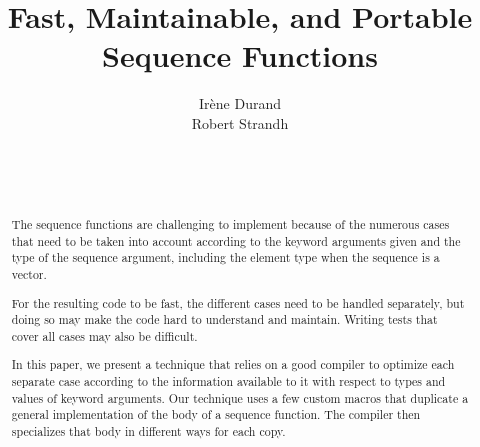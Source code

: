 \documentclass{acm_proc_article-sp}
\begin{document}
\title{Fast, Maintainable, and Portable Sequence Functions}
\author{\alignauthor
Irène Durand\\
Robert Strandh\\
\\
\\
\\
}


\maketitle

\begin{abstract}
The \commonlisp{} sequence functions are challenging to implement
because of the numerous cases that need to be taken into account
according to the keyword arguments given and the type of the sequence
argument, including the element type when the sequence is a vector.

For the resulting code to be fast, the different cases need to be
handled separately, but doing so may make the code hard to understand
and maintain.  Writing tests that cover all cases may also be
difficult.

In this paper, we present a technique that relies on a good compiler
to optimize each separate case according to the information available
to it with respect to types and values of keyword arguments.  Our
technique uses a few custom macros that duplicate a general
implementation of the body of a sequence function.  The compiler then
specializes that body in different ways for each copy.
\end{abstract}
\end{document}
